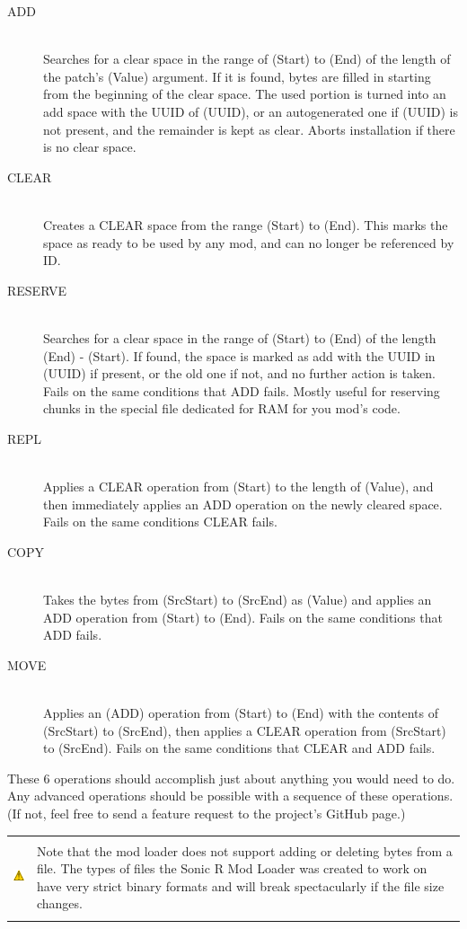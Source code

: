 \documentclass[12pt,a4paper,notitlepage]{article}
\newcommand{\warning}[1]{
	\begin{tabular}{ m{1.1cm}  m{11cm} }
	&\\
	\includegraphics[width=1.1cm, height=1.1cm]{warning} & #1
	\\&\\
	\end{tabular}
}
\begin{document}
\begin{description}
\item[ADD] \hfill \\ 
	Searches for a clear space in the range of (Start) to (End) of the length of the patch's (Value) argument. If it is found, bytes are filled in starting from the beginning of the clear space. The used portion is turned into an add space with the UUID of (UUID), or an autogenerated one if (UUID) is not present, and the remainder is kept as clear. Aborts installation if there is no clear space.
\item[CLEAR] \hfill \\
	Creates a CLEAR space from the range (Start) to (End). This marks the space as ready to be used by any mod, and can no longer be referenced by ID.
\item[RESERVE] \hfill \\
	Searches for a clear space in the range of (Start) to (End) of the length (End) - (Start). If found, the space is marked as add with the UUID in (UUID) if present, or the old one if not, and no further action is taken. Fails on the same conditions that ADD fails. Mostly useful for reserving chunks in the special file dedicated for RAM for you mod's code.
\item[REPL] \hfill \\
	Applies a CLEAR operation from (Start) to the length of (Value), and then immediately applies an ADD operation on the newly cleared space. Fails on the same conditions CLEAR fails.
\item[COPY] \hfill \\
	Takes the bytes from (SrcStart) to (SrcEnd) as (Value) and applies an ADD operation from (Start) to (End). Fails on the same conditions that ADD fails.
\item[MOVE] \hfill \\
	Applies an (ADD) operation from (Start) to (End) with the contents of (SrcStart) to (SrcEnd), then applies a CLEAR operation from (SrcStart) to (SrcEnd). Fails on the same conditions that CLEAR and ADD fails.
\end{description}

These 6 operations should accomplish just about anything you would need to do. Any advanced operations should be possible with a sequence of these operations. (If not, feel free to send a feature request to the project's GitHub page.)

\warning{Note that the mod loader does not support adding or deleting bytes from a file. The types of files the Sonic R Mod Loader was created to work on have very strict binary formats and will break spectacularly if the file size changes.}
\end{document}
